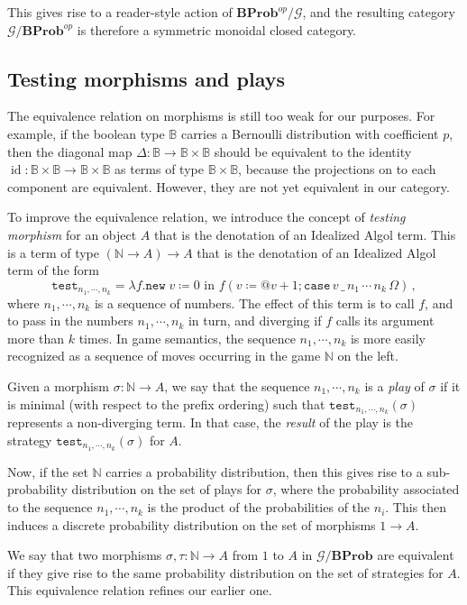 \documentclass{svproc}
\makeatletter
\newcommand\G{\mathcal{G}}
\DeclareMathOperator\id{id}
\newcommand{\test}{\texttt{test}}
\newcommand*\from{\colon}
\newcommand{\0}{{\mathtt{0}}} \newcommand{\com}{{\mathtt{com}}}
\newcommand{\deref}{\texttt{@}}
\newcommand{\new}{{\mathtt{new}}}
\renewcommand{\case}{{\mathtt{case}}}
\newcommand{\catname}[1]{\mathbf{#1}}
\newcommand{\BProb}{\catname{BProb}}
\newcommand{\bN}{\mathbb{N}}
\newcommand{\bB}{\mathbb{B}}
\makeatother
\begin{document}
This gives rise to a reader-style action of $\BProb^{op}/\G$, and the resulting category $\G/\BProb^{op}$ is therefore a symmetric monoidal closed category.  

\subsection{Testing morphisms and plays}

The equivalence relation on morphisms is still too weak for our purposes.  
For example, if the boolean type $\bB$ carries a Bernoulli distribution with coefficient $p$, then the diagonal map $\Delta\from \bB\to \bB\times\bB$ should be equivalent to the identity $\id\from\bB\times\bB\to\bB\times\bB$ as terms of type $\bB\times\bB$, because the projections on to each component are equivalent.  
However, they are not yet equivalent in our category.  

To improve the equivalence relation, we introduce the concept of \emph{testing morphism} for an object $A$ that is the denotation of an Idealized Algol term.
This is a term of type $(\bN \to A) \to A$ that is the denotation of an Idealized Algol term of the form
\[
  \test_{n_1,\cdots,n_k} = \lambda f.\new\;v\coloneqq 0 \text{ in } f(v \coloneqq \deref v + 1; \case\,v\,\_\,n_1\,\cdots\,n_k\,\Omega)\,,
  \]
where $n_1,\cdots,n_k$ is a sequence of numbers.  
The effect of this term is to call $f$, and to pass in the numbers $n_1,\cdots,n_k$ in turn, and diverging if $f$ calls its argument more than $k$ times.
In game semantics, the sequence $n_1,\cdots,n_k$ is more easily recognized as a sequence of moves occurring in the game $\bN$ on the left.  

Given a morphism $\sigma\from \bN \to A$, we say that the sequence $n_1,\cdots,n_k$ is a \emph{play} of $\sigma$ if it is minimal (with respect to the prefix ordering) such that $\test_{n_1,\cdots,n_k}(\sigma)$ represents a non-diverging term.
In that case, the \emph{result} of the play is the strategy $\test_{n_1,\cdots,n_k}(\sigma)$ for $A$.

Now, if the set $\bN$ carries a probability distribution, then this gives rise to a sub-probability distribution on the set of plays for $\sigma$, where the probability associated to the sequence $n_1,\cdots,n_k$ is the product of the probabilities of the $n_i$.  
This then induces a discrete probability distribution on the set of morphisms $1\to A$.

We say that two morphisms $\sigma,\tau\from \bN\to A$ from $1$ to $A$ in $\G/\BProb$ are equivalent if they give rise to the same probability distribution on the set of strategies for $A$.  
This equivalence relation refines our earlier one.
\end{document}
